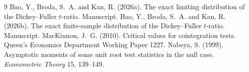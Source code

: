 \documentclass[11pt]{article}
\begin{document}
\begin{thebibliography}{9}
Bao, Y., Broda, S.~A. and Kan, R. (2026a).  The exact limiting distribution of the Dickey--Fuller $t$-ratio.  Manuscript.
Bao, Y., Broda, S.~A. and Kan, R. (2026b).  The exact finite-sample distribution of the Dickey--Fuller $t$-ratio.  Manuscript.
MacKinnon, J.~G. (2010).  Critical values for cointegration tests.  Queen's Economics Department Working Paper 1227.
Nabeya, S. (1999).  Asymptotic moments of some unit root test statistics in the null case.  \emph{Econometric Theory} 15, 139--149.
\end{thebibliography}
\end{document}
